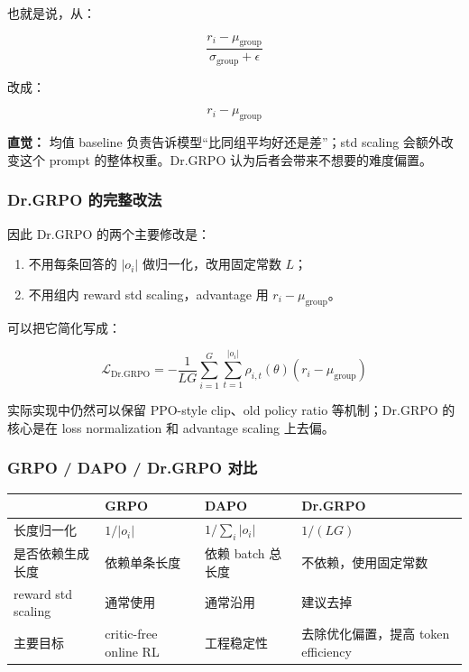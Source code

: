 也就是说，从：

\[
\frac{r_i-\mu_\text{group}}{\sigma_\text{group}+\epsilon}
\]

改成：

\[
r_i-\mu_\text{group}
\]

\begin{intubox}
\textbf{直觉：} 均值 baseline 负责告诉模型“比同组平均好还是差”；std scaling 会额外改变这个 prompt 的整体权重。Dr.GRPO 认为后者会带来不想要的难度偏置。
\end{intubox}

\subsubsection{Dr.GRPO 的完整改法}

因此 Dr.GRPO 的两个主要修改是：

\begin{enumerate}[leftmargin=1.5em]
  \item 不用每条回答的 $|o_i|$ 做归一化，改用固定常数 $L$；
  \item 不用组内 reward std scaling，advantage 用 $r_i-\mu_\text{group}$。
\end{enumerate}

可以把它简化写成：

\[
\mathcal{L}_\text{Dr.GRPO}
=
-
\frac{1}{LG}
\sum_{i=1}^{G}
\sum_{t=1}^{|o_i|}
\rho_{i,t}(\theta)
\left(
r_i-\mu_\text{group}
\right)
\]

实际实现中仍然可以保留 PPO-style clip、old policy ratio 等机制；Dr.GRPO 的核心是在 loss normalization 和 advantage scaling 上去偏。

\subsubsection{GRPO / DAPO / Dr.GRPO 对比}

\begin{center}
{\small
\begin{tabular}{p{3cm}p{3.2cm}p{3.2cm}p{3.2cm}}
\hline
 & \textbf{GRPO} & \textbf{DAPO} & \textbf{Dr.GRPO} \\
\hline
长度归一化
&
$1/|o_i|$
&
$1/\sum_i |o_i|$
&
$1/(LG)$
\\
是否依赖生成长度
&
依赖单条长度
&
依赖 batch 总长度
&
不依赖，使用固定常数
\\
reward std scaling
&
通常使用
&
通常沿用
&
建议去掉
\\
主要目标
&
critic-free online RL
&
工程稳定性
&
去除优化偏置，提高 token efficiency
\\
\hline
\end{tabular}
}
\end{center}

